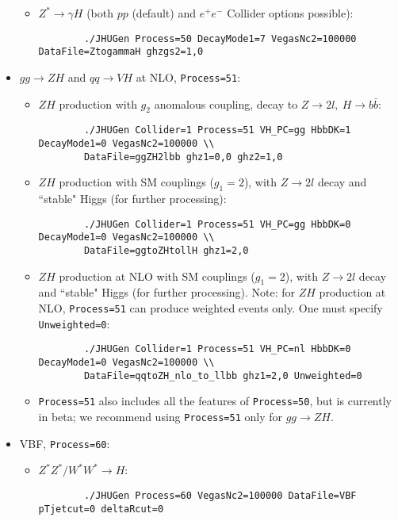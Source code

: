 \documentclass[aps,superscriptaddress,nofootinbib]{revtex4}
\begin{document}
\begin{itemize}
\begin{itemize}
\begin{verbatim}
		\end{verbatim}
		\item $Z^*\to\gamma H$ (both $pp$ (default) and $e^+e^-$ Collider options possible):
		\begin{verbatim}
		./JHUGen Process=50 DecayMode1=7 VegasNc2=100000 DataFile=ZtogammaH ghzgs2=1,0
		\end{verbatim}
	\end{itemize}
	\item $gg\to ZH$ and $qq\to VH$ at NLO, \texttt{Process=51}:
		\begin{itemize}
		\item $ZH$ production with $g_2$ anomalous coupling, decay to $Z\to 2l,~H\to b\bar{b}$:	
    		\begin{verbatim}
		./JHUGen Collider=1 Process=51 VH_PC=gg HbbDK=1 DecayMode1=0 VegasNc2=100000 \\
		DataFile=ggZH2lbb ghz1=0,0 ghz2=1,0
		\end{verbatim}
    		\item $ZH$ production with SM couplings ($g_1=2$), with $Z\to 2l$ decay and ``stable" Higgs (for further processing):
    		\begin{verbatim}
		./JHUGen Collider=1 Process=51 VH_PC=gg HbbDK=0 DecayMode1=0 VegasNc2=100000 \\
		DataFile=ggtoZHtollH ghz1=2,0
    		\end{verbatim}
		\item $ZH$ production at NLO with SM couplings ($g_1=2$), with $Z\to 2l$ decay and ``stable" Higgs (for further processing).
		Note: for $ZH$ production at NLO, \texttt{Process=51} can produce weighted events only. One must specify \texttt{Unweighted=0}:
    		\begin{verbatim}
		./JHUGen Collider=1 Process=51 VH_PC=nl HbbDK=0 DecayMode1=0 VegasNc2=100000 \\
		DataFile=qqtoZH_nlo_to_llbb ghz1=2,0 Unweighted=0
    		\end{verbatim}
		\item \texttt{Process=51} also includes all the features of \texttt{Process=50}, but is currently in beta; we recommend 
		using \texttt{Process=51} only for $gg\to ZH$.
	\end{itemize}		
	\item VBF, \texttt{Process=60}:
	\begin{itemize}
		\item $Z^*Z^*/W^*W^*\to H$:
		\begin{verbatim}
		./JHUGen Process=60 VegasNc2=100000 DataFile=VBF pTjetcut=0 deltaRcut=0

\end{verbatim}
\end{itemize}
\end{itemize}
\end{document}
